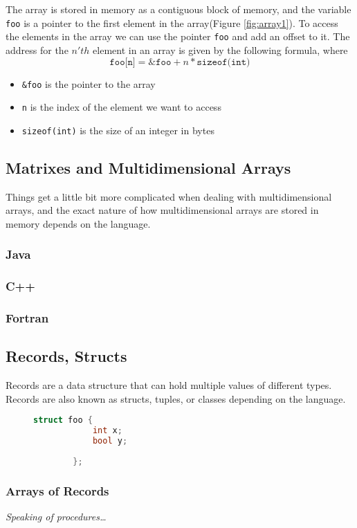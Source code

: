 The array is stored in memory as a contiguous block of memory, and the variable \texttt{foo} is a pointer to the first element in the array(Figure \ref{fig:array1}).
To access the elements in the array we can use the pointer \texttt{foo} and add an offset to it.
The address for the $n'th$ element in an array is given by the following formula, where
\begin{equation*}
    \texttt{foo[n]} = \texttt{\&foo} + n * \texttt{sizeof(int)}
\end{equation*}
\begin{itemize}
    \item \texttt{\&foo} is the pointer to the array
    \item \texttt{n} is the index of the element we want to access
    \item \texttt{sizeof(int)} is the size of an integer in bytes
\end{itemize}


\subsection{Matrixes and Multidimensional Arrays}
Things get a little bit more complicated when dealing with multidimensional arrays, and the exact nature of how multidimensional arrays are stored in memory depends on the language.
\subsubsection{Java}
\subsubsection{C++}
\subsubsection{Fortran}
\subsection{Records, Structs}
Records are a data structure that can hold multiple values of different types.
Records are also known as structs, tuples, or classes depending on the language.

\begin{figure}[!h]
    \begin{lstlisting}[language=c]
        struct foo {
            int x;
            bool y;
            
        };
    \end{lstlisting}
\end{figure}

\begin{figure}
\end{figure}
\subsubsection{Arrays of Records}


\textit{Speaking of procedures\dots}